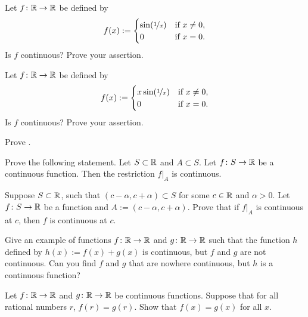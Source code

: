 \begin{exercise}
Let $f \colon {\mathbb{R}} \to {\mathbb{R}}$ be
defined by
\begin{equation*}
f(x) :=
\begin{cases}
\sin(\nicefrac{1}{x}) & \text{if } x \not= 0, \\
0 & \text{if } x=0.
\end{cases}
\end{equation*}
Is $f$ continuous?  Prove your assertion.
\end{exercise}

\begin{exercise}
Let $f \colon {\mathbb{R}} \to {\mathbb{R}}$ be
defined by
\begin{equation*}
f(x) :=
\begin{cases}
x \sin(\nicefrac{1}{x}) & \text{if } x \not= 0, \\
0 & \text{if } x=0.
\end{cases}
\end{equation*}
Is $f$ continuous?  Prove your assertion.
\end{exercise}

\begin{exercise}
Prove .
\end{exercise}

\begin{exercise} \label{exercise:restrictioncontinuous}
Prove the following statement.
Let $S \subset {\mathbb{R}}$ and $A \subset S$.  Let $f \colon S \to {\mathbb{R}}$
be a continuous function.
Then the restriction $f|_A$ is continuous.
\end{exercise}

\begin{exercise}
Suppose $S \subset {\mathbb{R}}$, such that $(c-\alpha,c+\alpha) \subset S$ for some $c \in {\mathbb{R}}$
and $\alpha > 0$.
Let $f \colon S \to {\mathbb{R}}$ be a function and $A:=(c-\alpha,c+\alpha)$.  Prove that
if $f|_A$ is continuous at $c$, then $f$ is continuous at $c$.
\end{exercise}

\begin{exercise}
Give an example of functions $f \colon {\mathbb{R}} \to {\mathbb{R}}$ and $g \colon {\mathbb{R}} \to {\mathbb{R}}$
such that the function $h$ defined by $h(x) := f(x) + g(x)$ is continuous,
but $f$ and $g$ are not continuous.  Can you find $f$ and $g$ that are nowhere
continuous, but $h$ is a continuous function?
\end{exercise}

\begin{exercise}
Let $f \colon {\mathbb{R}} \to {\mathbb{R}}$ and 
$g \colon {\mathbb{R}} \to {\mathbb{R}}$ be continuous functions.  Suppose that for
all rational numbers $r$, $f(r) = g(r)$.  Show that $f(x) = g(x)$ for all
$x$.
\end{exercise}

